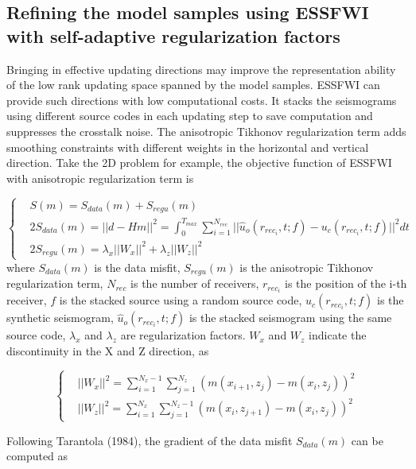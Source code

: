 \documentclass[mreferee]{gji}
\begin{document}
\subsection{Refining the model samples using ESSFWI with self-adaptive regularization factors}

Bringing in effective updating directions may improve the representation ability of the low rank updating space spanned by the model samples. ESSFWI can provide such directions with low computational costs. It stacks the seismograms using different source codes in each updating step to save computation and suppresses the crosstalk noise. The anisotropic Tikhonov regularization term adds smoothing constraints with different weights in the horizontal and vertical direction. Take the 2D problem for example, the objective function of ESSFWI with anisotropic regularization term is

\begin{equation}
\left\{
\begin{aligned}
& S(m)=S_{data}(m)+S_{regu}(m) \\
& 2S_{data}(m)=||d-Hm||^2=\int_{0}^{T_{max}}\sum_{i=1}^{N_{rec}}||\hat u_o(r_{rec_i},t;f)-u_c(r_{rec_i},t;f)||^2dt \\
& 2S_{regu}(m)=\lambda_x||W_x||^2+\lambda_z||W_z||^2
\end{aligned}
\right.
\end{equation}
where $S_{data}(m)$ is the data misfit, $S_{regu}(m)$ is the anisotropic Tikhonov regularization term, $N_{rec}$ is the number of receivers, $r_{rec_i}$ is the position of the i-th receiver, $f$ is the stacked source using a random source code, $u_c(r_{rec_i},t;f)$ is the synthetic seismogram, $\hat u_o(r_{rec_i},t;f)$ is the stacked seismogram using the same source code, $\lambda_x$ and $\lambda_z$ are regularization factors. $W_x$ and $W_z$ indicate the discontinuity in the X and Z direction, as

\begin{equation}
\left\{
\begin{aligned}
& ||W_x||^2=\sum_{i=1}^{N_x-1}\sum_{j=1}^{N_z}\left(m(x_{i+1},z_j)-m(x_i,z_j)\right)^2 \\
& ||W_z||^2=\sum_{i=1}^{N_x}\sum_{j=1}^{N_z-1}\left(m(x_i,z_{j+1})-m(x_i,z_j)\right)^2
\end{aligned}
\right.
\end{equation}

Following Tarantola (1984), the gradient of the data misfit $S_{data}(m)$ can be computed as
\end{document}
